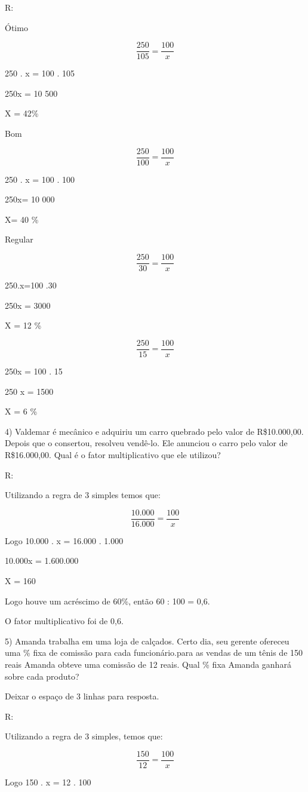 R:

Ótimo

\[\frac {250}{105} = \frac {100}{x}\]

250 . x = 100 . 105

250x = 10 500

X = 42\%

Bom

\[\frac {250}{100} = \frac {100}{x}\]

250 . x = 100 . 100

250x= 10 000

X= 40 \%

Regular

\[\frac {250}{30} = \frac {100}{x}\]

250.x=100 .30

250x = 3000

X = 12 \%

\[\frac {250}{15} = \frac {100}{x}\]

250x = 100 . 15

250 x = 1500

X = 6 \%

4) Valdemar é mecânico e adquiriu um carro quebrado pelo valor de
R\$10.000,00. Depois que o consertou, resolveu vendê-lo. Ele anunciou o
carro pelo valor de R\$16.000,00. Qual é o fator multiplicativo que ele
utilizou?

R:

Utilizando a regra de 3 simples temos que:

\[\frac {10.000}{16.000} = \frac {100}{x}\]

Logo 10.000 . x = 16.000 . 1.000

10.000x = 1.600.000

X = 160

Logo houve um acréscimo de 60\%, então 60 : 100 = 0,6.

O fator multiplicativo foi de 0,6.

5) Amanda trabalha em uma loja de calçados. Certo dia, seu gerente
ofereceu uma \% fixa de comissão para cada funcionário.para as vendas de
um tênis de 150 reais Amanda obteve uma comissão de 12 reais. Qual \%
fixa Amanda ganhará sobre cada produto?

Deixar o espaço de 3 linhas para resposta.

R:

Utilizando a regra de 3 simples, temos que:

\[\frac {150}{12} = \frac {100}{x}\]

Logo 150 . x = 12 . 100

